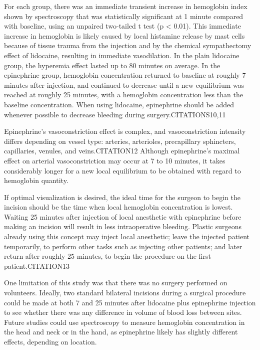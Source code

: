 For each group, there was an immediate transient increase in hemoglobin index shown by spectroscopy that was statistically significant at 1 minute compared with baseline, using an unpaired two-tailed t test (p < 0.01). This immediate increase in hemoglobin is likely caused by local histamine release by mast cells because of tissue trauma from the injection and by the chemical sympathectomy effect of lidocaine, resulting in immediate vasodilation. In the plain lidocaine group, the hyperemia effect lasted up to 80 minutes on average. In the epinephrine group, hemoglobin concentration returned to baseline at roughly 7 minutes after injection, and continued to decrease until a new equilibrium was reached at roughly 25 minutes, with a hemoglobin concentration less than the baseline concentration. When using lidocaine, epinephrine should be added whenever possible to decrease bleeding during surgery.CITATIONS10,11

Epinephrine's vasoconstriction effect is complex, and vasoconstriction intensity differs depending on vessel type: arteries, arterioles, precapillary sphincters, capillaries, venules, and veins.CITATION12 Although epinephrine's maximal effect on arterial vasoconstriction may occur at 7 to 10 minutes, it takes considerably longer for a new local equilibrium to be obtained with regard to hemoglobin quantity.

If optimal visualization is desired, the ideal time for the surgeon to begin the incision should be the time when local hemoglobin concentration is lowest. Waiting 25 minutes after injection of local anesthetic with epinephrine before making an incision will result in less intraoperative bleeding. Plastic surgeons already using this concept may inject local anesthetic; leave the injected patient temporarily, to perform other tasks such as injecting other patients; and later return after roughly 25 minutes, to begin the procedure on the first patient.CITATION13

One limitation of this study was that there was no surgery performed on volunteers. Ideally, two standard bilateral incisions during a surgical procedure could be made at both 7 and 25 minutes after lidocaine plus epinephrine injection to see whether there was any difference in volume of blood loss between sites. Future studies could use spectroscopy to measure hemoglobin concentration in the head and neck or in the hand, as epinephrine likely has slightly different effects, depending on location.